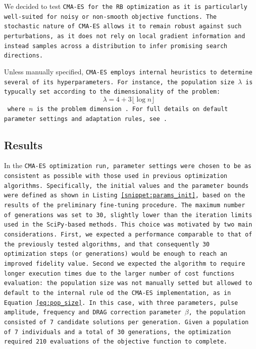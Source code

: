 We decided to test \tt{CMA-ES} for the RB optimization as it is particularly well-suited for noisy or non-smooth objective functions. 
The stochastic nature of \tt{CMA-ES} allows it to remain robust against such perturbations, as it does not rely on local gradient information and instead samples across a distribution to infer promising search directions.

Unless manually specified, \tt{CMA-ES} employs internal heuristics to determine several of its hyperparameters. 
For instance, the population size $\lambda$ is typucally set according to the dimensionality of the problem:
\begin{equation}\label{eq:pop_size}
    \lambda = 4+3\lfloor \log{n}\rfloor
\end{equation}
where $n$ is the problem dimension \cite{hansen_pycma_2024}.
For full details on default parameter settings and adaptation rules, see \cite{cmaessimplepractical}.

\subsection{Results}

In the \tt{CMA-ES} optimization run, parameter settings were chosen to be as consistent as possible with those used in previous optimization algorithms.
Specifically, the initial values and the parameter bounds were defined as shown in Listing \ref{snippet:params_init}, based on the results of the preliminary fine-tuning procedure. 
The maximum number of generations was set to 30, slightly lower than the iteration limits used in the \texttt{SciPy}-based methods.
This choice was motivated by two main considerations. First, we expected a performance comparable to that of the previously tested algorithms, and that consequently 30 optimization steps (or generations) would be enough to reach an improved fidelity value.
Second we expected the algorithm to require longer execution times due to the larger number of cost functions evaluation: the population size was not manually setted but allowed to default to the internal rule od the \tt{CMA-ES} implementation, as in Equation \ref{eq:pop_size}.
In this case, with three parameters, pulse amplitude, frequency and DRAG correction parameter $\beta$, the population consisted of 7 candidate solutions per generation.
Given a population of 7 individuals and a total of 30 generations, the optimization required 210 evaluations of the objective function to complete. 

